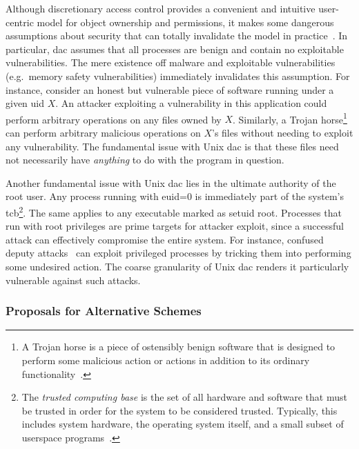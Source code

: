Although discretionary access control provides a convenient and intuitive user-centric
model for object ownership and permissions, it makes some dangerous assumptions about
security that can totally invalidate the model in
practice~\cite{shu2016_security_isolation_study}. In particular, \gls{dac} assumes that all
processes are benign and contain no exploitable vulnerabilities. The mere existence off
malware and exploitable vulnerabilities (e.g.\ memory safety vulnerabilities) immediately
invalidates this assumption. For instance, consider an honest but vulnerable piece of
software running under a given \gls{uid} $X$. An attacker exploiting a vulnerability in
this application could perform arbitrary operations on any files owned by $X$. Similarly,
a Trojan horse\footnote{A Trojan horse is a piece of ostensibly benign software that
is designed to perform some malicious action or actions in addition to its ordinary
functionality~\cite{van_oorschot2020_tools_jewels}.}~\cite{shu2016_security_isolation_study,
van_oorschot2020_tools_jewels} can perform arbitrary malicious operations on $X$'s files
without needing to exploit any vulnerability. The fundamental issue with Unix \gls{dac} is
that these files need not necessarily have \textit{anything} to do with the program in
question.

Another fundamental issue with Unix \gls{dac} lies in the ultimate authority of the root
user. Any process running with \gls{euid}=0 is immediately part of the system's
\gls{tcb}\footnote{The \textit{trusted computing base} is the set of all hardware
and software that must be trusted in order for the system to be considered trusted.
Typically, this includes system hardware, the operating system itself, and a small subset
of userspace programs~\cite{jaeger2008_os_security}.}. The same applies to any executable
marked as setuid root. Processes that run with root privileges are prime targets for
attacker exploit, since a successful attack can effectively compromise the entire system.
For instance, confused deputy attacks~\cite{hardy1988_confused_deputy,
shu2016_security_isolation_study} can exploit privileged processes by tricking them into
performing some undesired action. The coarse granularity of Unix \gls{dac} renders it
particularly vulnerable against such attacks.

\subsubsection*{Proposals for Alternative Schemes}

